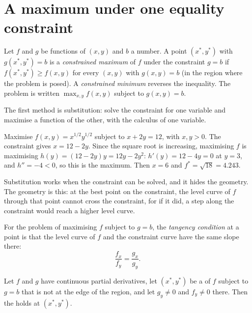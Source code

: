\section{A maximum under one equality constraint}\label{sec:b1:constrained-optimisation:equality}

\begin{definition}\label{def:b1:constrained-optimisation:constrained-max}
Let $f$ and $g$ be functions of $(x, y)$ and $b$ a number. A point
$(x^*, y^*)$ with $g(x^*, y^*) = b$ is a \emph{constrained maximum} of $f$
under the constraint $g = b$ if $f(x^*, y^*) \ge f(x, y)$ for every $(x, y)$
with $g(x, y) = b$ (in the region where the problem is posed). A
\emph{constrained minimum} reverses the inequality. The problem is written
$\max_{x, y} f(x, y)$ subject to $g(x, y) = b$.
\end{definition}

The first method is substitution: solve the constraint for one variable and
maximise a function of the other, with the calculus of one variable.

\begin{example}[Substitution]\label{ex:b1:constrained-optimisation:substitution}
Maximise $f(x, y) = x^{1/2}y^{1/2}$ subject to $x + 2y = 12$, with $x, y > 0$.
The constraint gives $x = 12 - 2y$. Since the square root is increasing,
maximising $f$ is maximising $h(y) = (12 - 2y)y = 12y - 2y^2$:
$h'(y) = 12 - 4y = 0$ at $y = 3$, and $h'' = -4 < 0$, so this is the
maximum. Then $x = 6$ and $f^* = \sqrt{18} = 4.243$.
\end{example}

Substitution works when the constraint can be solved, and it hides the
geometry. The geometry is this: at the best point on the constraint, the
level curve of $f$ through that point cannot cross the constraint, for if
it did, a step along the constraint would reach a higher level curve.

\begin{definition}\label{def:b1:constrained-optimisation:tangency}
For the problem of maximising $f$ subject to $g = b$, the \emph{tangency
condition} at a point is that the level curve of $f$ and the constraint
curve have the same slope there:
\[
\frac{f_x}{f_y} = \frac{g_x}{g_y}.
\]
\end{definition}

\begin{proposition}\label{prop:b1:constrained-optimisation:tangency}
Let $f$ and $g$ have continuous partial derivatives, let $(x^*, y^*)$ be a
 of $f$ subject to $g = b$ that is not at the edge of the
region, and let $g_y \neq 0$ and $f_y \neq 0$ there. Then the  holds at $(x^*, y^*)$.
\end{proposition}

